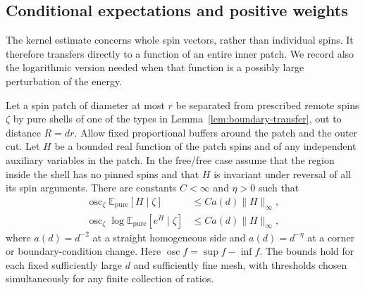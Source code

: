 \subsection{Conditional expectations and positive weights}

The kernel estimate concerns whole spin vectors, rather than individual
spins. It therefore transfers directly to a function of an entire
inner patch. We record also the logarithmic version needed when that
function is a possibly large perturbation of the energy.

\begin{corollary}
\label{cor:boundary-observables}
Let a spin patch of diameter at most $r$ be separated from prescribed
remote spins $\zeta$ by pure shells of one of the types in
Lemma~\ref{lem:boundary-transfer}, out to distance $R=dr$.
Allow fixed proportional buffers around the patch and the outer cut.
Let $H$ be a bounded real function of the patch spins and of any
independent auxiliary variables in the patch. In the free/free case
assume that the region inside the shell has no pinned spins and that
$H$ is invariant under reversal of all its spin arguments.
There are constants $C<\infty$ and $\eta>0$ such that
\begin{align}
 \mathop{\mathrm{osc}}_\zeta\mathbb E_{\mathrm{pure}}[H\mid\zeta]
       &\le C a(d)\|H\|_\infty,
       \label{eq:boundary-expectation-transfer}\\
 \mathop{\mathrm{osc}}_\zeta
        \log\mathbb E_{\mathrm{pure}}[e^H\mid\zeta]
       &\le C a(d)\|H\|_\infty,
       \label{eq:boundary-log-transfer}
\end{align}
where $a(d)=d^{-2}$ at a straight homogeneous side and
$a(d)=d^{-\eta}$ at a corner or boundary-condition change.
Here $\mathop{\mathrm{osc}} f=\sup f-\inf f$. The bounds hold for
each fixed sufficiently large $d$ and sufficiently fine mesh, with
thresholds chosen simultaneously for any finite collection of ratios.
\end{corollary}

